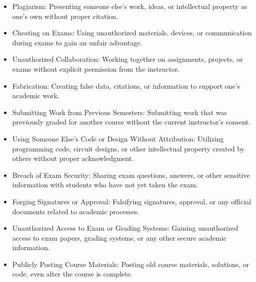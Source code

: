 \begin{itemize}
    \item Plagiarism: Presenting someone else's work, ideas, or intellectual property as one's own without proper citation.
    \item Cheating on Exams: Using unauthorized materials, devices, or communication during exams to gain an unfair advantage.
    \item Unauthorized Collaboration: Working together on assignments, projects, or exams without explicit permission from the instructor.
    \item Fabrication: Creating false data, citations, or information to support one's academic work.
    \item Submitting Work from Previous Semesters: Submitting work that was previously graded for another course without the current instructor's consent.
    \item Using Someone Else's Code or Design Without Attribution: Utilizing programming code, circuit designs, or other intellectual property created by others without proper acknowledgment.
    \item Breach of Exam Security: Sharing exam questions, answers, or other sensitive information with students who have not yet taken the exam.
    \item Forging Signatures or Approval: Falsifying signatures, approval, or any official documents related to academic processes.
    \item Unauthorized Access to Exam or Grading Systems: Gaining unauthorized access to exam papers, grading systems, or any other secure academic information.
    \item Publicly Posting Course Materials: Posting old course materials, solutions, or code, even after the course is complete.
\end{itemize}

